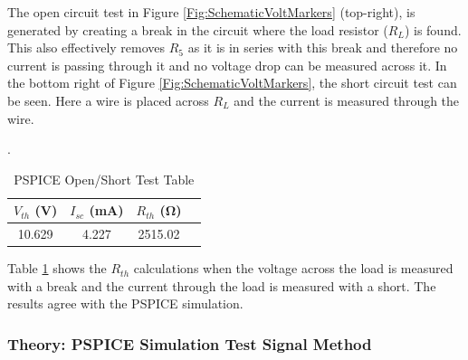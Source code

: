 \documentclass[11pt]{article}
\begin{document}
The open circuit test in Figure \ref{Fig:SchematicVoltMarkers} (top-right), is generated by creating a break in the circuit where the load resistor ($R_L$) is found. This also effectively removes $R_5$ as it is in series with this break and therefore no current is passing through it and no voltage drop can be measured across it. In the bottom right of Figure \ref{Fig:SchematicVoltMarkers}, the short circuit test can be seen. Here a wire is placed across $R_L$ and the current is measured through the wire.

\begin{table}[h!]
	\centering
	\caption{PSPICE Open/Short Test Table}.
	\label{Table:Lab3VocIscPSPICE}
	\begin{tabular}{|c|c|c|c|}
		\hline
		$V_{th}$ (\si{\volt})& $I_{sc}$ (\si{\milli\ampere}) & $R_{th}$ (\si{\ohm}) \\
		\hline
		10.629 & 4.227 & 2515.02 \\	 \hline 
	\end{tabular}
\end{table}
 
Table \ref{Table:Lab3VocIscPSPICE} shows the $R_{th}$ calculations when the voltage across the load is measured with a break and the current through the load is measured with a short. The results agree with the PSPICE simulation.
 
\subsubsection{Theory: PSPICE Simulation Test Signal Method }
\end{document}
